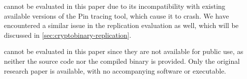  cannot be evaluated in this paper due to its incompatibility with existing available versions of the Pin tracing tool, which cause it to crash. We have encountered a similar issue in the replication evaluation as well, which will be discussed in \autoref{sec:cryptobinary-replication}.

 cannot be evaluated in this paper since they are not available for public use, as neither the source code nor the compiled binary is provided. Only the original research paper is available, with no accompanying software or executable.
